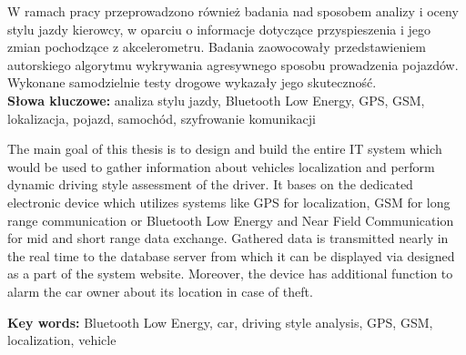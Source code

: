 \begin{singlespacing}
W ramach pracy przeprowadzono również badania nad sposobem analizy i oceny stylu jazdy kierowcy, w oparciu o informacje dotyczące przyspieszenia i jego zmian pochodzące z akcelerometru. Badania zaowocowały przedstawieniem autorskiego algorytmu wykrywania agresywnego sposobu prowadzenia pojazdów. Wykonane samodzielnie testy drogowe wykazały jego skuteczność. \\

\textbf{Słowa kluczowe: }analiza stylu jazdy, Bluetooth Low Energy, GPS, GSM, lokalizacja, pojazd, samochód, szyfrowanie komunikacji

\end{singlespacing}

\clearpage
\thispagestyle{empty}
\clearpage
\thispagestyle{empty}




\begin{singlespacing}


The main goal of this thesis is to design and build the entire IT system which would be used to gather information about vehicles localization and perform dynamic driving style assessment of the driver. It bases on the dedicated electronic device which utilizes systems like GPS for localization, GSM for long range communication or Bluetooth Low Energy and Near Field Communication for mid and short range data exchange. Gathered data is transmitted nearly in the real time to the database server from which it can be displayed via designed as a part of the system website. Moreover, the device has additional function to alarm the car owner about its location in case of theft.

\flushbottom
\textbf{Key words: }Bluetooth Low Energy, car, driving style analysis, GPS, GSM, localization, vehicle
\end{singlespacing}
